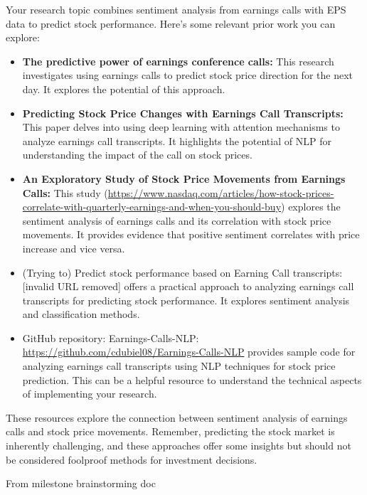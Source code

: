 \documentclass{article}
\begin{document}
Your research topic combines sentiment analysis from earnings calls with
EPS data to predict stock performance. Here's some relevant prior work
you can explore:

\begin{itemize}
\item
  \textbf{The predictive power of earnings conference calls:}
  This research \citep{Solberg2018ThePP} investigates using earnings calls to predict stock price direction for the next day.
  It explores the potential of this approach.
\item
  \textbf{Predicting Stock Price Changes with Earnings Call Transcripts:}
  This paper \citep{liang2016predicting} delves into using deep learning with attention mechanisms to analyze earnings call transcripts.
  It highlights the potential of NLP for understanding the impact of the call on stock prices.
\item
  \textbf{An Exploratory Study of Stock Price Movements from Earnings
  Calls:} This study
  (\url{https://www.nasdaq.com/articles/how-stock-prices-correlate-with-quarterly-earnings-and-when-you-should-buy})
  explores the sentiment analysis of earnings calls and its correlation
  with stock price movements. It provides evidence that positive
  sentiment correlates with price increase and vice versa.
\item
  (Trying to) Predict stock performance based on Earning Call
  transcripts: {[}invalid URL removed{]} offers a practical approach to
  analyzing earnings call transcripts for predicting stock performance.
  It explores sentiment analysis and classification methods.
\item
  GitHub repository: Earnings-Calls-NLP:
  \url{https://github.com/cdubiel08/Earnings-Calls-NLP} provides sample
  code for analyzing earnings call transcripts using NLP techniques for
  stock price prediction. This can be a helpful resource to understand
  the technical aspects of implementing your research.
\end{itemize}

These resources explore the connection between sentiment analysis of
earnings calls and stock price movements. Remember, predicting the stock
market is inherently challenging, and these approaches offer some
insights but should not be considered foolproof methods for investment
decisions.

From milestone brainstorming doc
\end{document}

